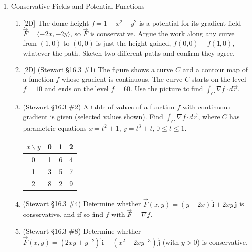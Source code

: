 \documentclass[12pt]{article}
\newcommand{\ihat}{\hat{\textbf{i}}}
\newcommand{\jhat}{\hat{\textbf{j}}}
\newcommand{\dimtag}[1]{{\footnotesize\textsc{[#1]}}\;}
\begin{document}
\begin{enumerate}
\item Conservative Fields and Potential Functions
    \begin{enumerate}
        \item \dimtag{2D} The dome height $f = 1 - x^2 - y^2$ is a potential for its gradient field $\vec F = \langle -2x, -2y\rangle$, so $\vec F$ is conservative. Argue the work along any curve from $(1,0)$ to $(0,0)$ is just the height gained, $f(0,0) - f(1,0)$, whatever the path. Sketch two different paths and confirm they agree.
        \item \dimtag{2D} (Stewart \S16.3 \#1) The figure shows a curve $C$ and a contour map of a function $f$ whose gradient is continuous. The curve $C$ starts on the level $f = 10$ and ends on the level $f = 60$. Use the picture to find $\int_C \nabla f\cdot d\vec r$.
        \begin{center}
        \end{center}
        \item (Stewart \S16.3 \#2) A table of values of a function $f$ with continuous gradient is given (selected values shown). Find $\int_C \nabla f\cdot d\vec r$, where $C$ has parametric equations $x = t^2 + 1,\ y = t^3 + t$, $0 \leq t \leq 1$.
        \begin{center}\begin{tabular}{c|ccc}
            $x \backslash y$ & 0 & 1 & 2 \\\hline
            0 & 1 & 6 & 4 \\
            1 & 3 & 5 & 7 \\
            2 & 8 & 2 & 9
        \end{tabular}\end{center}
        \item (Stewart \S16.3 \#4) Determine whether $\vec F(x,y) = (y-2x)\,\ihat + 2xy\,\jhat$ is conservative, and if so find $f$ with $\vec F = \nabla f$.
        \item (Stewart \S16.3 \#8) Determine whether $\vec F(x,y) = (2xy + y^{-2})\,\ihat + (x^2 - 2xy^{-3})\,\jhat$ (with $y > 0$) is conservative.

\end{enumerate}
\end{enumerate}
\end{document}
